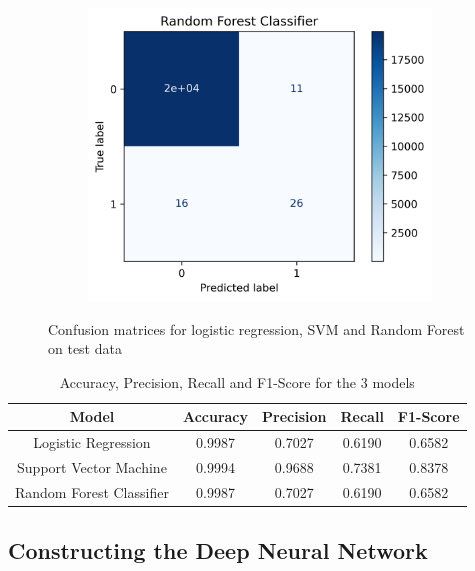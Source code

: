 \documentclass[utf8x]{ctexart}
\begin{document}
\begin{figure}[htb]
\begin{subfigure}[b]{0.32\textwidth}
  \end{subfigure}
  \begin{subfigure}[b]{0.32\textwidth}
    \centering
    \includegraphics[width=\textwidth]{./images/rfc_conf1.png}
    \label{fig:scalelocationplotprice}
  \end{subfigure}
  \caption{Confusion matrices for logistic regression, SVM and Random Forest on test data}
  \label{fig:confusion1}
\end{figure}

\begin{table}[ht]
  \centering
  \caption{Accuracy, Precision, Recall and F1-Score for the 3 models}
  \label{tab:metrics1}
  \begin{tabular}{c|cccc}
    Model                    & Accuracy & Precision & Recall & F1-Score \\
    \hline
    Logistic Regression      & 0.9987   & 0.7027    & 0.6190 & 0.6582   \\
    Support Vector Machine   & 0.9994   & 0.9688    & 0.7381 & 0.8378   \\
    Random Forest Classifier & 0.9987   & 0.7027    & 0.6190 & 0.6582   \\
  \end{tabular}
\end{table}

\subsection{Constructing the Deep Neural Network}
\end{document}
